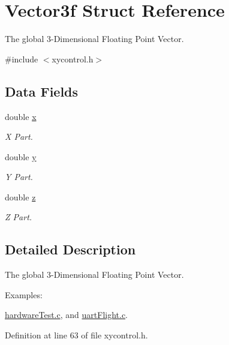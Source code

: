 \hypertarget{struct_vector3f}{\section{Vector3f Struct Reference}
\label{struct_vector3f}
}


The global 3-\/\-Dimensional Floating Point Vector.  




{\ttfamily \#include $<$xycontrol.\-h$>$}

\subsection*{Data Fields}
\begin{DoxyCompactItemize}
\item 
double \hyperlink{struct_vector3f_af88b946fb90d5f08b5fb740c70e98c10}{x}
\begin{DoxyCompactList}\small\item\em X Part. \end{DoxyCompactList}\item 
double \hyperlink{struct_vector3f_ab927965981178aa1fba979a37168db2a}{y}
\begin{DoxyCompactList}\small\item\em Y Part. \end{DoxyCompactList}\item 
double \hyperlink{struct_vector3f_ab3e6ed577a7c669c19de1f9c1b46c872}{z}
\begin{DoxyCompactList}\small\item\em Z Part. \end{DoxyCompactList}\end{DoxyCompactItemize}


\subsection{Detailed Description}
The global 3-\/\-Dimensional Floating Point Vector. 

\begin{Desc}
\item[Examples\-: ]\par
\hyperlink{hardware_test_8c-example}{hardware\-Test.\-c}, and \hyperlink{uart_flight_8c-example}{uart\-Flight.\-c}.\end{Desc}


Definition at line 63 of file xycontrol.\-h.



